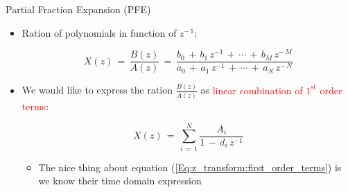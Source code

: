 \begin{frame}[t]{Partial Fraction Expansion (PFE)}


\begin{itemize}

\item Ration of polynomials in function of $z^{- \, 1}$:

	\begin{equation}
	X(z) \, = \, \displaystyle\frac{B(z)}{A(z)}   \, = \, \displaystyle\frac{b_0 \, + \, b_1 \, z^{-1} \, + \, \cdots \, + \, b_M \, z^{- \, M}}{a_0 \, + \, a_1 \, z^{-1} \, + \, \cdots \, + \, a_N \, z^{- \, N}}
	\end{equation}

\item We would like to express the ration $\displaystyle\frac{B(z)}{A(z)}$ as \textcolor{red}{linear combination of $1^{\mathrm{st}}$ order terms}:

	\begin{equation}
	X(z) \, = \, \displaystyle\sum\limits_{i \, = \, 1}^N\frac{A_i}{1 \, - \, d_i \, z^{-1}}
	\label{Eq:z_transform:first_order_terms}
	\end{equation}
	
	\begin{itemize}
	\item The nice thing about equation (\autoref{Eq:z_transform:first_order_terms}) is we know their time domain expression
	\end{itemize}

\end{itemize}

\end{frame}


